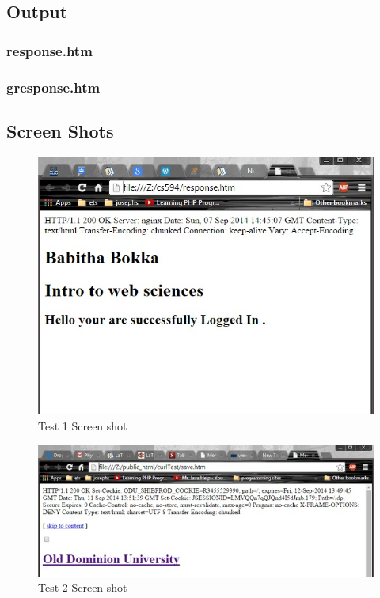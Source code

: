 \documentclass[12pt]{article}
\begin{document}
\subsection{Output}
\subsubsection{response.htm}

\subsubsection{gresponse.htm}

\subsection{Screen Shots}
\begin{figure}[ht]
\includegraphics[scale=0.7]{responseScreenShot}
\centering
\caption{Test 1 Screen shot}
\end{figure}

\begin{figure}
\includegraphics[scale=0.6]{gresponseScreenShot}
\centering
\caption{Test 2 Screen shot}
\end{figure}
\newpage
\end{document}
